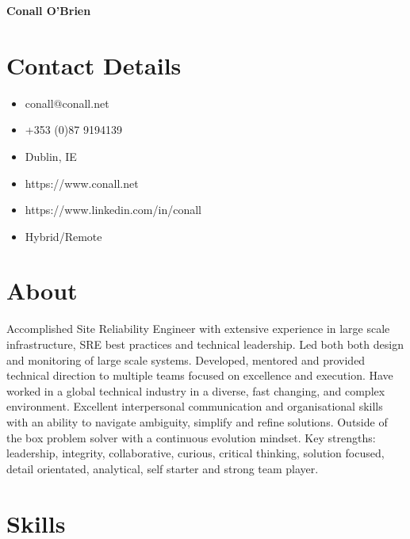 \documentclass[a4paper, 10pt] {article}
\begin{document}
\begingroup
  \centering
  \LARGE \textbf{Conall O'Brien}\\[1.5em]
\endgroup

\hrulefill

\section*{Contact Details}

\begin{multicols}{2}

  \begin{itemize}[noitemsep] 
    \item conall@conall.net
    \item +353 (0)87 9194139
    \item Dublin, IE
    \item https://www.conall.net
    \item https://www.linkedin.com/in/conall
    \item Hybrid/Remote
  \end{itemize}

\end{multicols}

\hrulefill

\section*{About}

Accomplished Site Reliability Engineer with extensive experience in
large scale infrastructure, SRE best practices and technical leadership.
Led both both design and monitoring of large scale systems.
Developed, mentored and provided technical direction to multiple teams
focused on excellence and execution. Have worked in a global technical
industry in a diverse, fast changing, and complex environment. Excellent
interpersonal communication and organisational skills with an ability to
navigate ambiguity, simplify and refine solutions. Outside of the box
problem solver with a continuous evolution mindset. Key strengths:
leadership, integrity, collaborative, curious, critical thinking, solution
focused, detail orientated, analytical, self starter and strong team player.

\section*{Skills}
\end{document}
